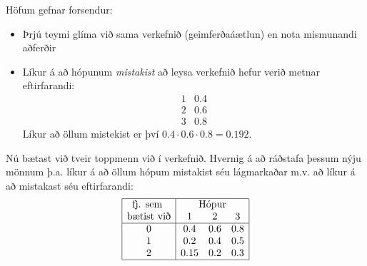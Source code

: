 \begin{daemi}Höfum gefnar forsendur:
  \begin{itemize}
    \item Þrjú teymi glíma við sama verkefnið (geimferðaáætlun) en nota mismunandi aðferðir
    \item Líkur á að hópunum \emph{mistakist} að leysa verkefnið hefur verið metnar eftirfarandi:
    \[\begin{matrix}       1 & 0.4 \\ 2 & 0.6 \\ 3 & 0.8       \end{matrix}\]
    Líkur að öllum mistekist er því $0.4\cdot0.6\cdot0.8=0.192$.
  \end{itemize}
  Nú bætast við tveir toppmenn við í verkefnið. Hvernig á að ráðstafa þessum nýju mönnum þ.a. líkur á að öllum hópum mistakist séu lágmarkaðar m.v. að líkur á að mistakast séu eftirfarandi:
 \[\begin{array}{|c|ccc|} \hline \mbox{fj. sem } & \multicolumn{3}{c|}{\mbox{Hópur}}\\
  \mbox{bætist við}& 1 & 2 & 3 \\ \hline
  0 & 0.4 & 0.6 & 0.8 \\
  1 & 0.2 & 0.4 & 0.5 \\
  2 & 0.15 & 0.2 & 0.3    \\\hline   
   \end{array}\]
\end{daemi}
